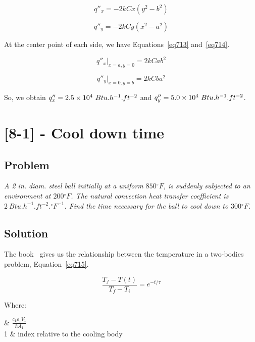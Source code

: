 \begin{equation}\label{eq711}
q''_x = -2kCx(y^2-b^2)
\end{equation}

\begin{equation}\label{eq712}
q''_y = -2kCy(x^2-a^2)
\end{equation}

At the center point of each side, we have Equations~\ref{eq713} and~\ref{eq714}.

\begin{equation}\label{eq713}
q''_x\bigg\rvert_{x=a, y=0} = 2kCab^2
\end{equation}

\begin{equation}\label{eq714}
q''_y\bigg\rvert_{x=0, y=b} = 2kCba^2
\end{equation}

So, we obtain $q''_x = \text{\num{2.5e4}}\ Btu.h^{-1}.ft^{-2}$ and $q''_y = \text{\num{5.0e4}}\ Btu.h^{-1}.ft^{-2}$.

\section{[8-1] - Cool down time}
\label{prob73}

\subsection{Problem}
\textit{A 2 in. diam. steel ball initially at a uniform $850{}^\circ F$, is suddenly subjected to an environment at $200{}^\circ F$. The natural convection heat transfer coefficient is $2\ Btu.h^{-1}.ft^{-2}.{}^\circ F^{-1}$. Find the time necessary for the ball to cool down to $300{}^\circ F$.}

\subsection{Solution}

The book~\cite{book01} gives us the relationship between the temperature in a two-bodies problem, Equation~\ref{eq715}.

\begin{equation}\label{eq715}
\frac{T_f - T(t)}{T_f - T_i} = e^{-t/\tau}
\end{equation}

Where:
\begin{conditions}
\tau & $\frac{c_1 \rho_1 V_1}{hA_1}$ \\
1 & index relative to the cooling body
\end{conditions}

